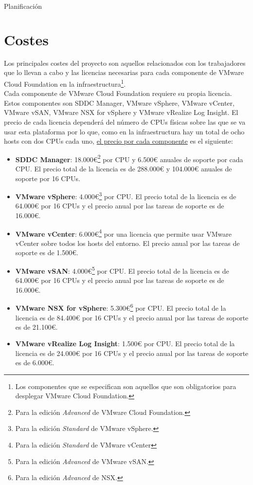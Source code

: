 \begin{chapter}{Planificación}
\section{Costes}
Los principales costes del proyecto son aquellos relacionados con los trabajadores que lo llevan a cabo y las licencias necesarias para cada componente de VMware Cloud Foundation en la infraestructura\footnote{Los componentes que se especifican son aquellos que son obligatorios para desplegar VMware Cloud Foundation.}.\\
Cada componente de VMware Cloud Foundation requiere su propia licencia\cite{licenses}. Estos componentes son SDDC Manager, VMware vSphere, VMware vCenter, VMware vSAN, VMware NSX for vSphere y VMware vRealize Log Insight. El precio de cada licencia dependerá del número de CPUs físicas sobre las que se va usar esta plataforma por lo que, como en la infraestructura hay un total de ocho hosts con dos CPUs cada uno, \underline{el precio por cada componente} es el siguiente:
\begin{itemize}
    \item \textbf{SDDC Manager}: 18.000€\footnote{Para la edición \textit{Advanced} de VMware Cloud Foundation.} por CPU y 6.500€ anuales de soporte por cada CPU. El precio total de la licencia es de 288.000€ y 104.000€ anuales de soporte por 16 CPUs.
    \item \textbf{VMware vSphere}: 4.000€\footnote{Para la edición \textit{Standard} de VMware vSphere.} por CPU. El precio total de la licencia es de 64.000€ por 16 CPUs y el precio anual por las tareas de soporte es de 16.000€.
    \item \textbf{VMware vCenter}: 6.000€\footnote{Para la edición \textit{Standard} de VMware vCenter} por una licencia que permite usar VMware vCenter sobre todos los hosts del entorno. El precio anual por las tareas de soporte es de 1.500€.
    \item \textbf{VMware vSAN}: 4.000€\footnote{Para la edición \textit{Advanced} de VMware vSAN.} por CPU. El precio total de la licencia es de 64.000€ por 16 CPUs y el precio anual por las tareas de soporte es de 16.000€.
    \item \textbf{VMware NSX for vSphere}: 5.300€\footnote{Para la edición \textit{Advanced} de NSX.} por CPU. El precio total de la licencia es de 84.400€ por 16 CPUs y el precio anual por las tareas de soporte es de 21.100€.
    \item \textbf{VMware vRealize Log Insight}: 1.500€ por CPU. El precio total de la licencia es de 24.000€ por 16 CPUs y el precio anual por las tareas de soporte es de 6.000€.
\end{itemize}


\end{chapter}
